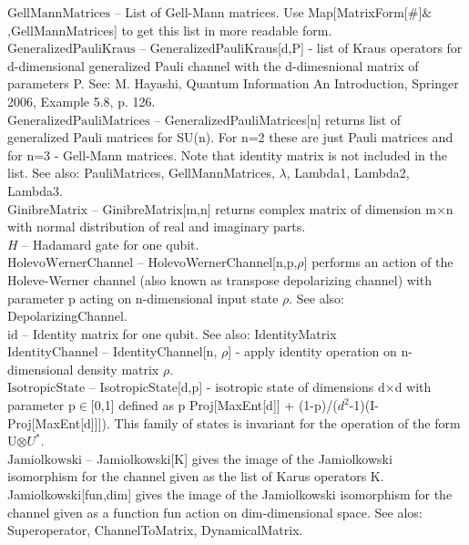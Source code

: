 \documentclass[a4paper,10pt]{scrartcl}
\begin{document}
\textbf{$ \text{GellMannMatrices} $ }-- List of Gell-Mann matrices. Use Map[MatrixForm[$\#$]$\&$,GellMannMatrices] to get this list in more readable form.$  $\\

\textbf{$ \text{GeneralizedPauliKraus} $ }-- GeneralizedPauliKraus[d,P] - list of Kraus operators for d-dimensional generalized Pauli channel with the d-dimesnional matrix of parameters P. See: M. Hayashi, Quantum Information An Introduction, Springer 2006, Example 5.8, p. 126.$  $\\

\textbf{$ \text{GeneralizedPauliMatrices} $ }-- GeneralizedPauliMatrices[n] returns list of generalized Pauli matrices for SU(n). For n=2 these are just Pauli matrices and for n=3 - Gell-Mann matrices. Note that identity matrix is not included in the list. See also: PauliMatrices, GellMannMatrices, $\lambda $, Lambda1, Lambda2, Lambda3.$  $\\

\textbf{$ \text{GinibreMatrix} $ }-- GinibreMatrix[m,n] returns complex matrix of dimension m$\times $n with normal distribution of real and imaginary parts.$  $\\

\textbf{$ H $ }-- Hadamard gate for one qubit.$  $\\

\textbf{$ \text{HolevoWernerChannel} $ }-- HolevoWernerChannel[n,p,$\rho $] performs an action of the Holeve-Werner channel (also known as transpose depolarizing channel) with parameter p acting on n-dimensional input state $\rho $. See also: DepolarizingChannel.$  $\\

\textbf{$ \text{id} $ }-- Identity matrix for one qubit. See also: IdentityMatrix$  $\\

\textbf{$ \text{IdentityChannel} $ }-- IdentityChannel[n, $\rho $] - apply identity operation on n-dimensional density matrix $\rho $.$  $\\

\textbf{$ \text{IsotropicState} $ }-- IsotropicState[d,p] - isotropic state of dimensions d$\times $d with parameter p$\in $[0,1] defined as p Proj[MaxEnt[d]] + (1-p)/($ d^2 $-1)(I-Proj[MaxEnt[d]]]). This family of states is invariant for the operation of the form U$\otimes $$ U^*. $\\

\textbf{$ \text{Jamiolkowski} $ }-- Jamiolkowski[K] gives the image of the Jamiolkowski isomorphism for the channel given as the list of Karus operators K. Jamiolkowski[fun,dim] gives the image of the Jamiolkowski isomorphism for the channel given as a function fun action on dim-dimensional space. See alos: Superoperator, ChannelToMatrix, DynamicalMatrix.$  $\\
\end{document}
